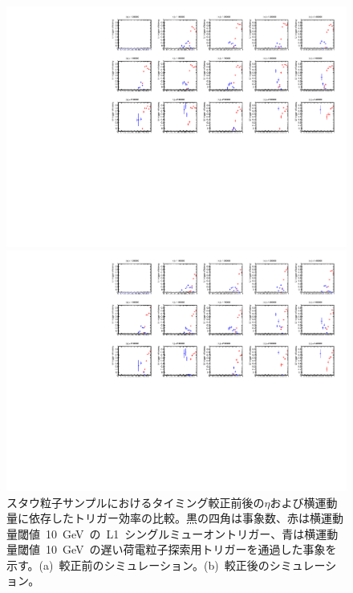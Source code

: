 \begin{figure}[H]
    \begin{minipage}{0.49\hsize}
    \centering   
    \includegraphics[width=\textwidth,page=14]{img/rec/stau_600_ori.pdf}
    \subcaption{}
    \end{minipage}
    \begin{minipage}{0.49\hsize}
    \centering   
    \includegraphics[width=\textwidth,page=14]{img/rec/stau_600.pdf}
    \subcaption{}
    \end{minipage}
    \caption[スタウ粒子サンプルにおけるタイミング較正前後の$\eta$および横運動量に依存したトリガー効率の比較]{スタウ粒子サンプルにおけるタイミング較正前後の$\eta$および横運動量に依存したトリガー効率の比較。黒の四角は事象数、赤は横運動量閾値~10~GeV~の~L1~シングルミューオントリガー、青は横運動量閾値~10~GeV~の遅い荷電粒子探索用トリガーを通過した事象を示す。(a)~較正前のシミュレーション。(b)~較正後のシミュレーション。}\label{fig:tripteta}
\end{figure}
